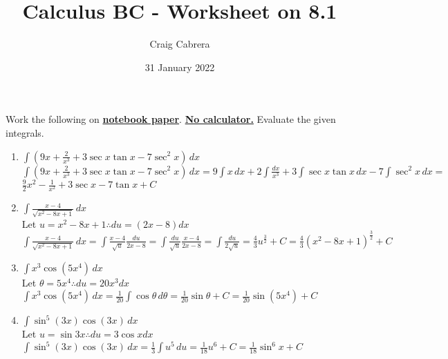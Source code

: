 \documentclass[10pt, letterpaper]{report}
\title{Calculus BC - Worksheet on 8.1}
\author{Craig Cabrera}
\date{31 January 2022}
\begin{document}
\maketitle
Work the following on \textbf{\underline{notebook paper}}. \textbf{\underline{No calculator.}}
Evaluate the given integrals.
\begin{enumerate}
  \item{$\int{\left(9x+\frac{2}{x^{3}}+3\sec{x}\tan{x}-7\sec^{2}{x}\right)}\,dx$} \\

    $\int{\left(9x+\frac{2}{x^{3}}+3\sec{x}\tan{x}-7\sec^{2}{x}\right)}\,dx=
    9\int{x}\,dx+2\int{\frac{dx}{x^{3}}}+3\int{\sec{x}\tan{x}}\,dx-7\int{\sec^{2}{x}}\,dx=$ \\

    $\frac{9}{2}x^{2}-\frac{1}{x^{2}}+3\sec{x}-7\tan{x}+C$ \\

  \item{$\int{\frac{x-4}{\sqrt{x^{2}-8x+1}}}\,dx$} \\

    Let $u=x^{2}-8x+1\therefore du=(2x-8)dx$ \\

    $\int{\frac{x-4}{\sqrt{x^{2}-8x+1}}}\,dx=
    \int{\frac{x-4}{\sqrt{u}}}\frac{du}{2x-8}=
    \int{\frac{du}{\sqrt{u}}}\frac{x-4}{2x-8}=
    \int{\frac{du}{2\sqrt{u}}}=
    \frac{4}{3}u^{\frac{3}{2}}+C=
    \frac{4}{3}\left(x^{2}-8x+1\right)^{\frac{3}{2}}+C$ \\

  \item{$\int{x^{3}\cos{\left(5x^{4}\right)}}\,dx$} \\

    Let $\theta=5x^{4}\therefore du=20x^{3}dx$ \\

    $\int{x^{3}\cos{\left(5x^{4}\right)}}\,dx=
    \frac{1}{20}\int{\cos{\theta}}\,d\theta=
    \frac{1}{20}\sin{\theta}+C=
    \frac{1}{20}\sin{(5x^{4})}+C$ \\

  \item{$\int{\sin^{5}{(3x)}\cos{(3x)}}\,dx$} \\

    Let $u=\sin{3x}\therefore du=3\cos{x}dx$ \\

    $\int{\sin^{5}{(3x)}\cos{(3x)}}\,dx=\frac{1}{3}\int{u^{5}}\,du=\frac{1}{18}u^{6}+C=\frac{1}{18}\sin^{6}{x}+C$ \\


\end{enumerate}
\end{document}
